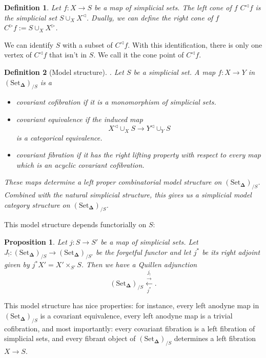 \documentclass[a4paper, 12pt]{amsart}
\newcommand{\8}{\infty}
\newcommand{\SSet}{\text{Set}_\boldsymbol{\Delta}}
\newtheorem{definition}{Definition}
\newtheorem{proposition}{Proposition}
\begin{document}
\begin{definition}
  Let $f:X\rightarrow S$ be a map of simplicial sets. The left cone of $f$ $C^
      {\triangleleft}f$ is the simplicial set $\displaystyle S\cup_X X^{\triangleleft} $. Dually, we can define the right cone of $f$ $C^{\triangleright}f:=\displaystyle S\cup_X X^{\triangleright}$.
\end{definition}

We can identify $S$ with a subset of $C^{\triangleleft}f$. With this identification, there is only one vertex of $C^{\triangleleft}f$ that isn't in $S$. We call it the cone point of $C^{\triangleleft}f$.

\begin{definition}[Model structure]. Let $S$ be a simplicial set. A map $f:X\rightarrow Y$ in $(\SSet)_{/S}$ is a
  \begin{itemize}
    \item covariant cofibration if it is a monomorphism of simplicial sets.
    \item covariant equivalence if the induced map \[X^{\triangleleft}\displaystyle \cup_X S \rightarrow Y^{\triangleleft}\cup_Y S\] is a categorical equivalence.
    \item covariant fibration if it has the right lifting property with respect to every map which is an acyclic covariant cofibration.
  \end{itemize}
  These maps determine a left proper combinatorial model structure on $(\SSet)_{/S}$. Combined with the natural simplicial structure, this gives us a simplicial model category structure on $(\SSet)_{/S}$.
\end{definition}

This model structure depends functorially on $S$:
\begin{proposition}
  Let $j:S\rightarrow S'$ be a map of simplicial sets. Let $J_!: (\SSet)_{/S}\rightarrow (\SSet)_{/S'}$ be the forgetful functor and let $j^*$ be its right adjoint given by $j^*X' = X'\times_{S'} S$. Then we have a Quillen adjunction 
  \[(\SSet)_{/S}\underset{j^*}{\overset{j_!}{\overset{\rightarrow}{\leftarrow}}}.\]
\end{proposition}

This model structure has nice properties: for instance, every left anodyne map in $(\SSet)_{/S}$ is a covariant equivalence, every left anodyne map is a trivial cofibration, and most importantly: every covariant fibration is a left fibration of simplicial sets, and every fibrant object of $(\SSet)_{/S}$ determines a left fibration $X\rightarrow S$.
\end{document}
